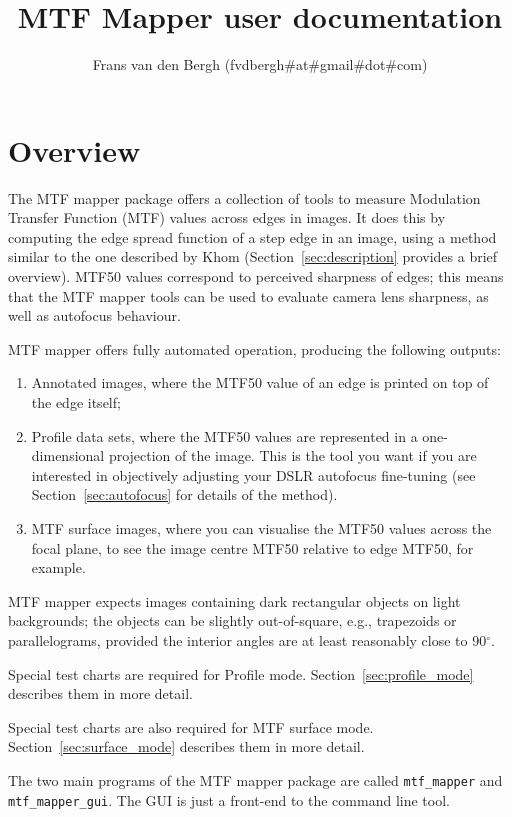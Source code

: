 \documentclass[a4paper]{article}
\title{MTF Mapper user documentation}
\author{Frans van den Bergh (fvdbergh\#at\#gmail\#dot\#com)}
\begin{document}
\maketitle

\tableofcontents

\newpage

\section{Overview}
The MTF mapper package offers a collection of tools to measure Modulation
Transfer Function (MTF) values across edges in images. 
It does this by computing the edge spread function of a step edge in an
image, using a method similar to the one described by Khom \cite{khom}
(Section~\ref{sec:description} provides a brief overview).
MTF50 values correspond to perceived sharpness of edges; this means that the
MTF mapper tools can be used to evaluate camera lens sharpness, as well as
autofocus behaviour.

MTF mapper offers fully automated operation, producing the following
outputs:
\begin{enumerate}
    \item Annotated images, where the MTF50 value of an edge is printed on top
of the edge itself;
    \item Profile data sets, where the MTF50 values are represented in a
one-dimensional projection of the image. This is the tool you want if you
are interested in objectively adjusting your DSLR autofocus fine-tuning (see
Section~\ref{sec:autofocus} for details of the method).
    \item MTF surface images, where you can visualise the MTF50 values
across the focal plane, to see the image centre MTF50 relative to edge MTF50,
for example.
\end{enumerate}

MTF mapper expects images containing dark rectangular objects on light
backgrounds; the objects can be slightly out-of-square, e.g., trapezoids or
parallelograms, provided the interior angles are at least reasonably close
to 90$^\circ$.

Special test charts are required for Profile mode.
Section~\ref{sec:profile_mode} describes them in more detail.

Special test charts are also required for MTF surface mode.
Section~\ref{sec:surface_mode} describes them in more detail.

The two main programs of the MTF mapper package are called \verb+mtf_mapper+
and \verb+mtf_mapper_gui+. The GUI is just a front-end to the command line
tool.
\end{document}
